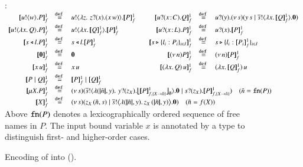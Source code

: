 \begin{figure}[t!]
 :
\\
$
\begin{array}{rclcrcl}
	\pmapp{\bout{u}{w} P}{1}{f}	&\defeq&	\bout{u}{ \abs{z}{\,\binp{z}{x} (\appl{x}{w})} } \pmapp{P}{1}{f}
	&&
	\pmapp{\binp{u}{\AT{x}{C}} Q}{1}{f}	&\defeq&	\binp{u}{y} \newsp{s}{\appl{y}{s} \Par \bout{\dual{s}}{\abs{x}{\pmapp{Q}{1}{f}}} \inact}
	\\[1mm]

	\pmapp{\bout{u}{\abs{{x}}{Q}} P}{1}{f}  &\defeq& \bout{u}{\abs{{x}}{\pmapp{Q}{1}{f}}} \pmapp{P}{1}{f}
	&&
	\pmapp{\binp{u}{\AT{x}{L}} P}{1}{f} &\defeq& \binp{u}{x} \pmapp{P}{1}{f}
	\\[1mm]

	\pmapp{\bsel{s}{l} P}{1}{f} &\defeq& \bsel{s}{l} \pmapp{P}{1}{f}
	&&
	\pmapp{\bbra{s}{l_i: P_i}_{i \in I}}{1}{f} &\defeq& \bbra{s}{l_i: \pmapp{P_i}{1}{f}}_{i \in I}
	\\[1mm]

	\pmapp{\inact}{1}{f} &\defeq& \inact
	&&
	\pmapp{\news{n} P}{1}{f} &\defeq& \news{n} \pmapp{P}{1}{f}
	\\[1mm]

	\pmapp{{x}\, {u}}{1}{f} &\defeq& \appl{x}{u}
	& &
	\pmapp{\appl{(\abs{x}{Q})}{u}}{1}{f} &\defeq& \appl{(\abs{x}{\pmapp{Q}{1}{f}})}{u}
	\\[1mm]

	\pmapp{P \Par Q}{1}{f} & \!\!\defeq\!\! &\pmapp{P}{1}{f} \Par \pmapp{Q}{1}{f}
	\\
	\pmapp{\recp{X}{P}}{1}{f} &\defeq& 
	\multicolumn{5}{l}{
		\newsp{s}{\bout{\dual{s}}{\abs{(\vmap{\tilde{n}}, y)} \,{\binp{y}{z_\X} \auxmapp{\pmapp{P}{1}{{f,\{\rvar{X}\to \tilde{n}\}}}}{{}}{\es}}} \inact \Par  \binp{s}{z_\X} \pmapp{P}{1}{{f,\{\rvar{X}\to \tilde{n}\}}}}
	\quad
	(\tilde{n} = \fn{P})
	}
	\\ 
	\pmapp{\rvar{X}}{1}{f} & \defeq &
	\multicolumn{5}{l}{
		\newsp{s}{\appl{z_X}{(\tilde{n}, s)} \Par \bbout{\dual{s}}{ \abs{(\vmap{\tilde{n}},y)}{\appl{z_X}{(\vmap{\tilde{n}}, y)}}} \inact}  \quad (\tilde{n} = f(\rvar{X}))
	}
\end{array}
$
\\[1mm]
%
Above $\fn{P}$ denotes a lexicographically ordered sequence  of free names in $P$.
The input bound variable $x$ is annotated by a type to distinguish first- and higher-order cases.
\caption{\label{f:enc:hopi_to_ho}Encoding of \HOp into \HO ().}
\end{figure}

